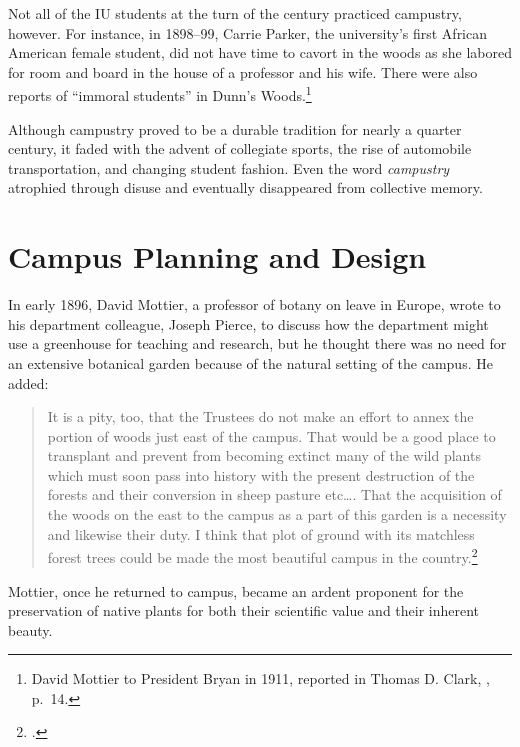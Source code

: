 \documentclass[
  american,
  letterpaper,
]{scrreprt}
\begin{document}
Not all of the IU students at the turn of the century practiced
campustry, however. For instance, in 1898--99, Carrie Parker, the
university's first African American female student, did not have time to
cavort in the woods as she labored for room and board in the house of a
professor and his wife. There were also reports of ``immoral students''
in Dunn's Woods.\footnote{David Mottier to President Bryan in 1911,
  reported in Thomas D. Clark, , p.~14.}

Although campustry proved to be a durable tradition for nearly a quarter
century, it faded with the advent of collegiate sports, the rise of
automobile transportation, and changing student fashion. Even the word
\emph{campustry} atrophied through disuse and eventually disappeared
from collective memory.

\section{Campus Planning and Design}\label{campus-planning-and-design}

In early 1896, David Mottier, a professor of botany on leave in Europe,
wrote to his department colleague, Joseph Pierce, to discuss how the
department might use a greenhouse for teaching and research, but he
thought there was no need for an extensive botanical garden because of
the natural setting of the campus. He added:

\begin{quote}
It is a pity, too, that the Trustees do not make an effort to annex the
portion of woods just east of the campus. That would be a good place to
transplant and prevent from becoming extinct many of the wild plants
which must soon pass into history with the present destruction of the
forests and their conversion in sheep pasture etc\ldots. That the
acquisition of the woods on the east to the campus as a part of this
garden is a necessity and likewise their duty. I think that plot of
ground with its matchless forest trees could be made the most beautiful
campus in the country.\footnote{.}
\end{quote}

Mottier, once he returned to campus, became an ardent proponent for the
preservation of native plants for both their scientific value and their
inherent beauty.
\end{document}

